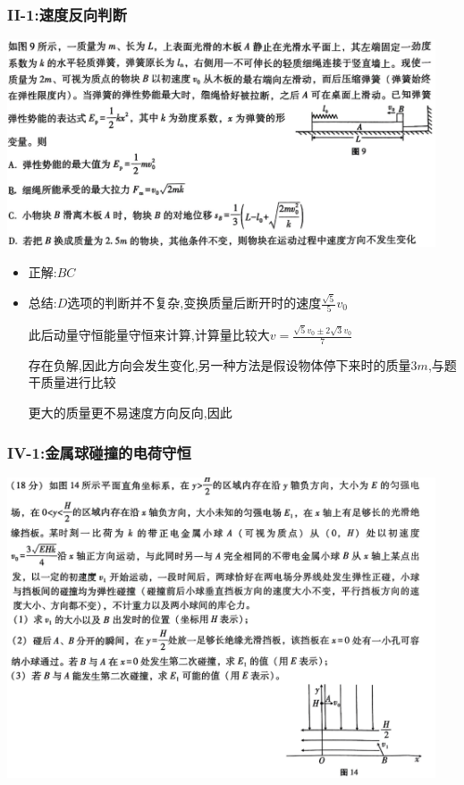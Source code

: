 \documentclass{article}
\begin{document}
\subsubsection{II-1:速度反向判断}
\includegraphics[width=0.95\textwidth,keepaspectratio]{./pictures/3.8-1.png}

\begin{itemize}
    \item 正解:\quad $BC$
    \item 总结:\quad $D$选项的判断并不复杂,变换质量后断开时的速度$\frac{\sqrt{5}}{5} v_{0}$

          \hspace{2.7em}此后动量守恒能量守恒来计算,计算量比较大$v = \frac{\sqrt{5}v_{0} \pm 2\sqrt{3}v_{0}}{7}$

          \hspace{2.7em}存在负解,因此方向会发生变化,另一种方法是假设物体停下来时的质量$3m$,与题干质量进行比较

          \hspace{2.7em}更大的质量更不易速度方向反向,因此
\end{itemize}

\vspace{2em}

\subsubsection{IV-1:金属球碰撞的电荷守恒}
\includegraphics[width=0.95\textwidth,keepaspectratio]{./pictures/3.8-2.png}
\end{document}
